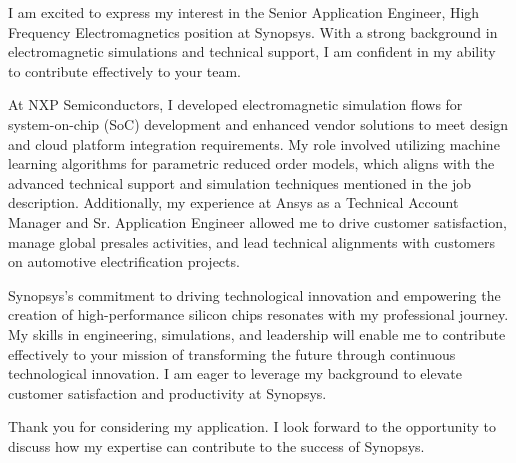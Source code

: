 I am excited to express my interest in the Senior Application Engineer, High Frequency Electromagnetics position at Synopsys. With a strong background in electromagnetic simulations and technical support, I am confident in my ability to contribute effectively to your team.

\medskip

At NXP Semiconductors, I developed electromagnetic simulation flows for system-on-chip (SoC) development and enhanced vendor solutions to meet design and cloud platform integration requirements. My role involved utilizing machine learning algorithms for parametric reduced order models, which aligns with the advanced technical support and simulation techniques mentioned in the job description.
Additionally, my experience at Ansys as a Technical Account Manager and Sr. Application Engineer allowed me to drive customer satisfaction, manage global presales activities, and lead technical alignments with customers on automotive electrification projects. 

\medskip

Synopsys's commitment to driving technological innovation and empowering the creation of high-performance silicon chips resonates with my professional journey. My skills in engineering, simulations, and leadership will enable me to contribute effectively to your mission of transforming the future through continuous technological innovation. I am eager to leverage my background to elevate customer satisfaction and productivity at Synopsys.

\medskip

Thank you for considering my application. I look forward to the opportunity to discuss how my expertise can contribute to the success of Synopsys.